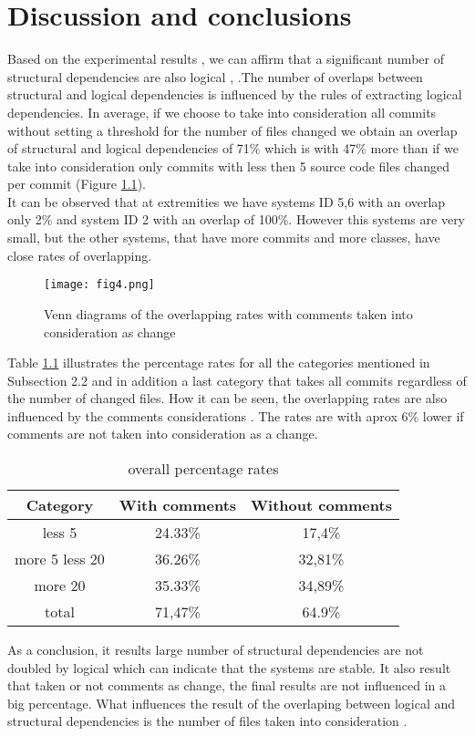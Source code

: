 \chapter{Discussion and conclusions}

Based on the experimental results , we can affirm that a significant number of structural dependencies are also logical \cite{ct10}, \cite{ct9}.The number of overlaps between structural and logical dependencies is influenced by the rules of extracting logical dependencies. In average, if we choose to take into consideration all commits without setting a threshold for the number of files changed we obtain an overlap of structural and logical dependencies of 71\% which is with 47\% more than if we take into consideration only commits with less then 5 source code files changed per commit (Figure \ref{fig:fig4}). \\ It can be observed that at extremities we have systems ID 5,6 with an overlap only 2\% and system ID 2 with an overlap of 100\%. However this systems are very small, but the other systems, that have more commits and more classes, have close rates of overlapping.
\begin{figure}[h]
\centering
\texttt{[image: fig4.png]}
\caption{Venn diagrams of the overlapping rates with comments taken into consideration as change}
\label{fig:fig4}
\end{figure}


Table \ref{table:7} illustrates the percentage rates for all the categories mentioned in Subsection 2.2 and in addition a last category that takes all commits regardless of the number of changed files. How it can be seen, the overlapping rates are also influenced by the comments considerations . The rates are with aprox 6\% lower if comments are not taken into consideration as a change. 


\begin{table}[h]
  \centering
  \begin{tabular}{@{}c||cc@{}}
    \toprule
       Category & With comments & Without comments  \\
    \midrule
less 5	&	24.33\% &	17,4\%	\\
more 5 less 20	&	36.26\% &	32,81\%\\
more 20	&	35.33\%	&	34,89\%\\
total & 71,47\% & 64.9\% \\
    \bottomrule
  \end{tabular}
  \caption{ overall percentage rates }
   \label{table:7}
\end{table}

As a conclusion, it results large number of structural dependencies are not doubled by logical which can indicate that the systems are stable. It also result that taken or not comments as change, the final results are not influenced in a big percentage. What influences the result of the overlaping between logical and structural dependencies is the number of files taken into consideration .